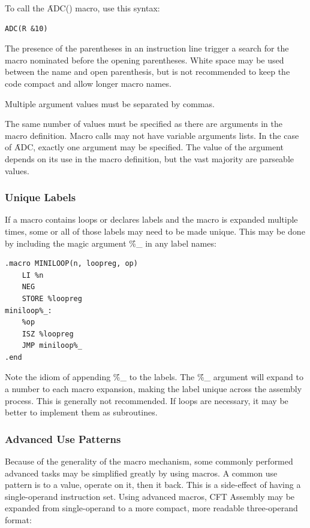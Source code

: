To call the \f{ADC()} macro, use this syntax:

\begin{lstlisting}[language=cftasm,numbers=none]
ADC(R &10)
\end{lstlisting}

The presence of the parentheses in an instruction line trigger a search for the
macro nominated before the opening parentheses. White space may be used between
the name and open parenthesis, but is not recommended to keep the code compact
and allow longer macro names.

Multiple argument values must be separated by commas.

The same number of values must be specified as there are arguments in the macro
definition. Macro calls may not have variable arguments lists. In the case of
\f{ADC}, exactly one argument may be specified. The value of the argument
depends on its use in the macro definition, but the vast majority are parseable
values.

\subsubsection{Unique Labels}

If a macro contains loops or declares labels and the macro is expanded multiple
times, some or all of those labels may need to be made unique. This may be done
by including the magic argument \f{\%\_} in any label names:

\begin{lstlisting}[language=cftasm]
.macro MINILOOP(n, loopreg, op)
    LI %n
    NEG
    STORE %loopreg
miniloop%_:
    %op
    ISZ %loopreg
    JMP miniloop%_
.end
\end{lstlisting}

Note the idiom of appending \f{\%\_} to the labels. The \f{\%\_} argument will
expand to a number to each macro expansion, making the label unique across the
assembly process. This is generally not recommended. If loops are necessary, it
may be better to implement them as subroutines.


\subsubsection{Advanced Use Patterns}

Because of the generality of the macro mechanism, some commonly performed
advanced tasks may be simplified greatly by using macros. A common use pattern
is to  a value, operate on it, then  it back. This is a
side-effect of having a single-operand instruction set. Using advanced macros,
CFT Assembly may be expanded from single-operand to a more compact, more
readable three-operand format:

